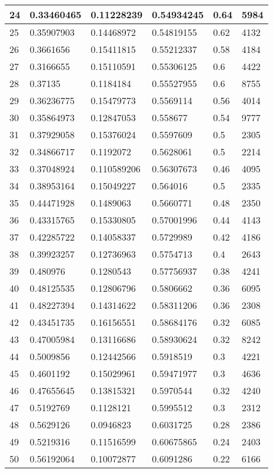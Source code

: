 \begin{longtable}{|l|l|l|l|l|l|}
24 & 0.33460465 & 0.11228239 & 0.54934245 & 0.64 & 5984 \\ \hline 
25 & 0.35907903 & 0.14468972 & 0.54819155 & 0.62 & 4132 \\ \hline 
26 & 0.3661656 & 0.15411815 & 0.55212337 & 0.58 & 4184 \\ \hline 
27 & 0.3166655 & 0.15110591 & 0.55306125 & 0.6 & 4422 \\ \hline 
28 & 0.37135 & 0.1184184 & 0.55527955 & 0.6 & 8755 \\ \hline 
29 & 0.36236775 & 0.15479773 & 0.5569114 & 0.56 & 4014 \\ \hline 
30 & 0.35864973 & 0.12847053 & 0.558677 & 0.54 & 9777 \\ \hline 
31 & 0.37929058 & 0.15376024 & 0.5597609 & 0.5 & 2305 \\ \hline 
32 & 0.34866717 & 0.1192072 & 0.5628061 & 0.5 & 2214 \\ \hline 
33 & 0.37048924 & 0.110589206 & 0.56307673 & 0.46 & 4095 \\ \hline 
34 & 0.38953164 & 0.15049227 & 0.564016 & 0.5 & 2335 \\ \hline 
35 & 0.44471928 & 0.1489063 & 0.5660771 & 0.48 & 2350 \\ \hline 
36 & 0.43315765 & 0.15330805 & 0.57001996 & 0.44 & 4143 \\ \hline 
37 & 0.42285722 & 0.14058337 & 0.5729989 & 0.42 & 4186 \\ \hline 
38 & 0.39923257 & 0.12736963 & 0.5754713 & 0.4 & 2643 \\ \hline 
39 & 0.480976 & 0.1280543 & 0.57756937 & 0.38 & 4241 \\ \hline 
40 & 0.48125535 & 0.12806796 & 0.5806662 & 0.36 & 6095 \\ \hline 
41 & 0.48227394 & 0.14314622 & 0.58311206 & 0.36 & 2308 \\ \hline 
42 & 0.43451735 & 0.16156551 & 0.58684176 & 0.32 & 6085 \\ \hline 
43 & 0.47005984 & 0.13116686 & 0.58930624 & 0.32 & 8242 \\ \hline 
44 & 0.5009856 & 0.12442566 & 0.5918519 & 0.3 & 4221 \\ \hline 
45 & 0.4601192 & 0.15029961 & 0.59471977 & 0.3 & 4636 \\ \hline 
46 & 0.47655645 & 0.13815321 & 0.5970544 & 0.32 & 4240 \\ \hline 
47 & 0.5192769 & 0.1128121 & 0.5995512 & 0.3 & 2312 \\ \hline 
48 & 0.5629126 & 0.0946823 & 0.6031725 & 0.28 & 2386 \\ \hline 
49 & 0.5219316 & 0.11516599 & 0.60675865 & 0.24 & 2403 \\ \hline 
50 & 0.56192064 & 0.10072877 & 0.6091286 & 0.22 & 6166 \\ \hline 
\end{longtable}